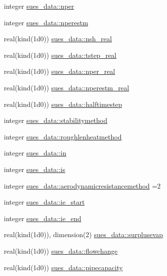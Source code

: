 \begin{DoxyCompactItemize}
\item 
integer \hyperlink{namespacesues__data_aee4c8e6d4c94a2af0599fb1cd40f51ed}{sues\+\_\+data\+::nper}
\item 
integer \hyperlink{namespacesues__data_a699b9583b9326461b9220d76056b85b5}{sues\+\_\+data\+::nperestm}
\item 
real(kind(1d0)) \hyperlink{namespacesues__data_ab2070158f8b88b8f7835232841061718}{sues\+\_\+data\+::nsh\+\_\+real}
\item 
real(kind(1d0)) \hyperlink{namespacesues__data_a81a241a978fdd040dee716c4e68dc786}{sues\+\_\+data\+::tstep\+\_\+real}
\item 
real(kind(1d0)) \hyperlink{namespacesues__data_a130a64aeadd8ca145f5ec2d1416174f5}{sues\+\_\+data\+::nper\+\_\+real}
\item 
real(kind(1d0)) \hyperlink{namespacesues__data_aad88365e0d1f6430e9ac39dd331048c1}{sues\+\_\+data\+::nperestm\+\_\+real}
\item 
real(kind(1d0)) \hyperlink{namespacesues__data_a6e2f669999914372fd2de922c917e6dc}{sues\+\_\+data\+::halftimestep}
\item 
integer \hyperlink{namespacesues__data_a1005846b0d388b51d731e6d5e404e2d6}{sues\+\_\+data\+::stabilitymethod}
\item 
integer \hyperlink{namespacesues__data_a9dff10e1f001cc8241e5d1d72a4beeb2}{sues\+\_\+data\+::roughlenheatmethod}
\item 
integer \hyperlink{namespacesues__data_ae5a31f2a4addf36e077f1e18eabf6052}{sues\+\_\+data\+::in}
\item 
integer \hyperlink{namespacesues__data_a38a6478771abe06a6cf4334fe858c0ef}{sues\+\_\+data\+::is}
\item 
integer \hyperlink{namespacesues__data_a1780a57f30571faa7263e9cd248a8dd0}{sues\+\_\+data\+::aerodynamicresistancemethod} =2
\item 
integer \hyperlink{namespacesues__data_a64de572d5505a9ff4174a4703db24a9e}{sues\+\_\+data\+::ie\+\_\+start}
\item 
integer \hyperlink{namespacesues__data_a7f97cb4ce39cccee777bae8977654da7}{sues\+\_\+data\+::ie\+\_\+end}
\item 
real(kind(1d0)), dimension(2) \hyperlink{namespacesues__data_a08d117cca68ee0e84a8b286a038434c6}{sues\+\_\+data\+::surplusevap}
\item 
real(kind(1d0)) \hyperlink{namespacesues__data_aafb79a529ff89254c1399e96d77a5fe0}{sues\+\_\+data\+::flowchange}
\item 
real(kind(1d0)) \hyperlink{namespacesues__data_ab2dc1363710dd5d250384fe643279fd7}{sues\+\_\+data\+::pipecapacity}

\end{DoxyCompactItemize}
